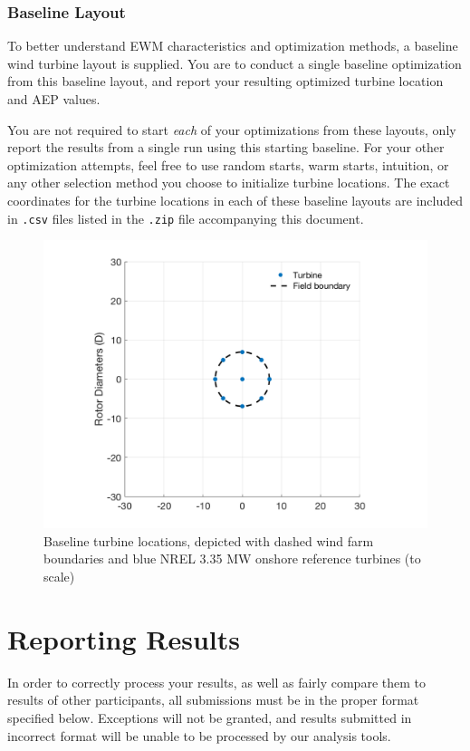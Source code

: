 \documentclass[12pt]{article}
\begin{document}
    \subsubsection{Baseline Layout}
    To better understand EWM characteristics and optimization methods, a baseline wind turbine layout is supplied. You are to conduct a single baseline optimization from this baseline layout, and report your resulting optimized turbine location and AEP values.
    
    You are not required to start \textit{each} of your optimizations from these layouts, only report the results from a single run using this starting baseline. For your other optimization attempts, feel free to use random starts, warm starts, intuition, or any other selection method you choose to initialize turbine locations. The exact coordinates for the turbine locations in each of these baseline layouts are included in \texttt{.csv} files listed in the \texttt{.zip} file accompanying this document.
    
    \begin{figure}[H]
        \centering
        \includegraphics[width=.65\linewidth]{BaselineCmbndFarm.png}
        \caption{Baseline turbine locations, depicted with dashed wind farm boundaries and blue NREL 3.35 MW onshore reference turbines (to scale)} \label{fig:BaseLoc}
    \end{figure}

\newpage
\section{Reporting Results}
In order to correctly process your results, as well as fairly compare them to results of other participants, all submissions must be in the proper format specified below. Exceptions will not be granted, and results submitted in incorrect format will be unable to be processed by our analysis tools.
\end{document}
